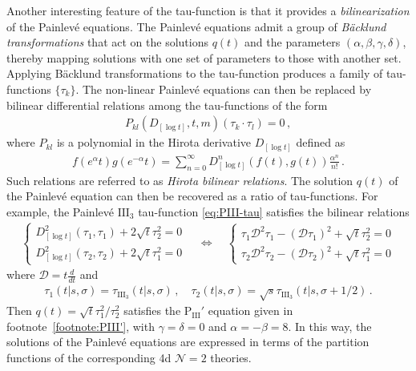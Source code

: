 \documentclass[11pt, a4paper]{article}
\theoremstyle{definition}
\begin{document}
Another interesting feature of the tau-function is that it provides a \emph{bilinearization} of the Painlev\'e equations. The Painlev\'e equations admit a group of \emph{B\"acklund transformations} that act on the solutions $ q(t) $ and the parameters $ (\alpha,\beta,\gamma,\delta) $, thereby mapping solutions with one set of parameters to those with another set. Applying B\"acklund transformations to the tau-function produces a family of tau-functions $ \{\tau_k\} $. The non-linear Painlev\'e equations can then be replaced by bilinear differential relations among the tau-functions of the form
\begin{align}
    P_{kl}(D_{[\log t]}, t, m)(\tau_k \cdot \tau_l) = 0 \, ,
\end{align}
where $ P_{kl} $ is a polynomial in the Hirota derivative $ D_{[\log t]} $ defined as
\begin{align}
    f(e^{\alpha}t) g(e^{-\alpha}t) = \sum_{n=0}^\infty D_{[\log t]}^n(f(t),g(t)) \frac{\alpha^n}{n!} \, .
\end{align}
Such relations are referred to as \emph{Hirota bilinear relations}. The solution $ q(t) $ of the Painlev\'e equation can then be recovered as a ratio of tau-functions. For example, the Painlev\'e $ \text{III}_3 $ tau-function \eqref{eq:PIII-tau} satisfies the bilinear relations \cite{Bershtein:2016uov}
\begin{align}\label{eq:PIII3-bilinear}
    \left\{ \begin{array}{l}
            D^2_{[\log t]}(\tau_1, \tau_1) + 2\sqrt{t} \tau_2^2 = 0 \\[1ex]
            D^2_{[\log t]}(\tau_2, \tau_2) + 2\sqrt{t} \tau_1^2 = 0 
    \end{array}\right. \quad \Leftrightarrow \quad
    \left\{ \begin{array}{l}
            \tau_1 \mathcal{D}^2\tau_1 - (\mathcal{D}\tau_1)^2 + \sqrt{t} \tau_2^2 = 0 \\[1ex]
            \tau_2 \mathcal{D}^2\tau_2 - (\mathcal{D}\tau_2)^2 + \sqrt{t} \tau_1^2 = 0 
        \end{array}\right.
\end{align}
where $ \mathcal{D} = t \frac{d}{dt} $ and
\begin{align}
    \tau_1(t|s,\sigma) = \tau_{\text{III}_3}(t|s,\sigma) \, , \quad
    \tau_2(t|s,\sigma) = \sqrt{s} \tau_{\text{III}_3}(t|s,\sigma+1/2) \, .
\end{align}
Then $ q(t) = \sqrt{t} \tau_1^2 / \tau_2^2 $ satisfies the $ \mathrm{P}_{\mathrm{III}}' $ equation given in footnote~\ref{footnote:PIII'}, with $ \gamma=\delta=0 $ and $ \alpha=-\beta=8 $. In this way, the solutions of the Painlev\'e equations are expressed in terms of the partition functions of the corresponding 4d $ \mathcal{N}=2 $ theories.
\end{document}
